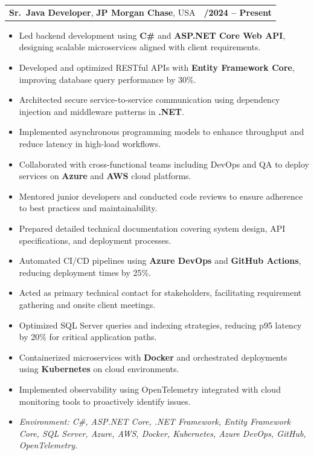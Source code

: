 \documentclass[letterpaper,11pt]{article}
\makeatletter
\newcommand{\resumeItem}[1]{
  \item\footnotesize{
    {#1 \vspace{-2pt}}
  }
}
\newcommand{\resumeSubheading}[4]{
  \vspace{-2pt}\item
    \begin{tabular*}{1.0\textwidth}[t]{l@{\extracolsep{\fill}}r}
      \textbf{\fontsize{10pt}{14pt}\selectfont #3}, \textbf{\fontsize{10pt}{14pt}\selectfont #1}, \fontsize{10pt}{14pt}\selectfont #4 & \textbf{\fontsize{10pt}{14pt}\selectfont #2} \\
    \end{tabular*}\vspace{-7pt}
}
\newcommand{\resumeItemListStart}{\begin{itemize}[leftmargin=*]}
\newcommand{\resumeItemListEnd}{\end{itemize}\vspace{-5pt}}
\makeatother
\begin{document}
\resumeSubheading
{JP Morgan Chase}{09/2024 -- Present}
{Sr.\ Java Developer}{USA}
\resumeItemListStart
  \resumeItem{Led backend development using \textbf{C\#} and \textbf{ASP.NET Core Web API}, designing scalable microservices aligned with client requirements.}
  \resumeItem{Developed and optimized RESTful APIs with \textbf{Entity Framework Core}, improving database query performance by 30\%.}
  \resumeItem{Architected secure service-to-service communication using dependency injection and middleware patterns in \textbf{.NET}.}
  \resumeItem{Implemented asynchronous programming models to enhance throughput and reduce latency in high-load workflows.}
  \resumeItem{Collaborated with cross-functional teams including DevOps and QA to deploy services on \textbf{Azure} and \textbf{AWS} cloud platforms.}
  \resumeItem{Mentored junior developers and conducted code reviews to ensure adherence to best practices and maintainability.}
  \resumeItem{Prepared detailed technical documentation covering system design, API specifications, and deployment processes.}
  \resumeItem{Automated CI/CD pipelines using \textbf{Azure DevOps} and \textbf{GitHub Actions}, reducing deployment times by 25\%.}
  \resumeItem{Acted as primary technical contact for stakeholders, facilitating requirement gathering and onsite client meetings.}
  \resumeItem{Optimized SQL Server queries and indexing strategies, reducing p95 latency by 20\% for critical application paths.}
  \resumeItem{Containerized microservices with \textbf{Docker} and orchestrated deployments using \textbf{Kubernetes} on cloud environments.}
  \resumeItem{Implemented observability using OpenTelemetry integrated with cloud monitoring tools to proactively identify issues.}
  \resumeItem{\textit{Environment: C\#, ASP.NET Core, .NET Framework, Entity Framework Core, SQL Server, Azure, AWS, Docker, Kubernetes, Azure DevOps, GitHub, OpenTelemetry.}}
\resumeItemListEnd
\end{document}
